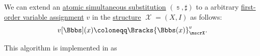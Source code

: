 \begin{algorithm}\label{alg:fol_assignment_substitution}\mimprovised
  We can extend an \hyperref[def:atomic_lambda_term_substitution]{atomic simultaneous substitution} \( (\Bbbs, \sharp) \) to a arbitrary \hyperref[def:fol_variable_assignment]{first-order variable assignment} \( v \) in the \hyperref[def:fol_structure]{structure} \( \mscrX = (X, I) \) as follows:
  \begin{equation}\label{eq:alg:fol_assignment_substitution}
    v[\Bbbs](x) \coloneqq \Bracks{\Bbbs(x)}_\mscrX^v.
  \end{equation}
\end{algorithm}
\begin{comments}
  \item This algorithm is implemented in \cite{notebook:code} as
  \begin{CodeRefDisplay}
  \end{CodeRefDisplay}
\end{comments}

